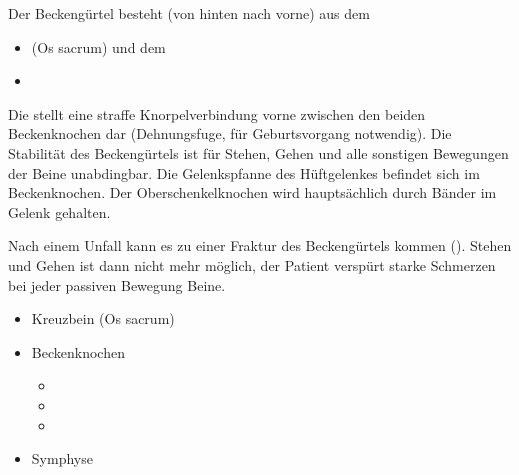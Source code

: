 {
Der Beckengürtel besteht (von hinten nach vorne) aus dem
\begin{itemize}
    \item {} (Os sacrum) und dem 
    \item {}
\end{itemize}
Die  stellt eine straffe
Knorpelverbindung vorne zwischen den beiden Beckenknochen
dar (Dehnungsfuge, für Geburtsvorgang notwendig).
Die Stabilität des Beckengürtels ist für Stehen, Gehen und
alle sonstigen Bewegungen der Beine unabdingbar. Die
Gelenkspfanne des Hüftgelenkes befindet sich im
Beckenknochen. Der Oberschenkelknochen wird hauptsächlich
durch Bänder im Gelenk gehalten.

Nach einem Unfall kann es zu einer Fraktur des
Beckengürtels kommen (). Stehen und Gehen ist dann
nicht mehr möglich, der Patient verspürt starke Schmerzen
bei jeder passiven Bewegung  Beine.

}
{
\begin{itemize}
    \item Kreuzbein (Os sacrum)
    \item Beckenknochen
    \begin{itemize}
        \item {}
        \item {}
        \item {}
    \end{itemize}
    \item Symphyse
\end{itemize}
}
{}{}{}

